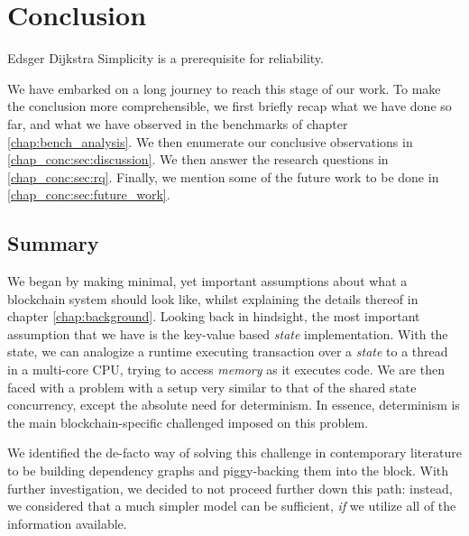 \chapter{Conclusion} \label{chap:conclusion}

\begin{chapquote}{Edsger Dijkstra}
    Simplicity is a prerequisite for reliability.
\end{chapquote}

We have embarked on a long journey to reach this stage of our work. To make the conclusion more
comprehensible, we first briefly recap what we have done so far, and what we have observed in the
benchmarks of chapter \ref{chap:bench_analysis}. We then enumerate our conclusive observations in
\ref{chap_conc:sec:discussion}. We then answer the research questions in \ref{chap_conc:sec:rq}.
Finally, we mention some of the future work to be done in \ref{chap_conc:sec:future_work}.

\section{Summary}

We began by making minimal, yet important assumptions about what a blockchain system should look
like, whilst explaining the details thereof in chapter \ref{chap:background}. Looking back in
hindsight, the most important assumption that we have is the key-value based \textit{state}
implementation. With the state, we can analogize a runtime executing transaction over a
\textit{state} to a thread in a multi-core CPU, trying to access \textit{memory} as it executes
code. We are then faced with a problem with a setup very similar to that of the shared state
concurrency, except the absolute need for determinism. In essence, determinism is the main
blockchain-specific challenged imposed on this problem.

We identified the de-facto way of solving this challenge in contemporary literature to be building
dependency graphs and piggy-backing them into the block. With further investigation, we decided to
not proceed further down this path: instead, we considered that a much simpler model can be
sufficient, \textit{if} we utilize all of the information available.

